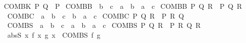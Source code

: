 \begin{isabellebody}
{\isachardoublequoteopen}COMBK\ P\ Q\ {\isacharequal}{\kern0pt}\ P{\isachardoublequoteclose}\isanewline
\isanewline
{}\isamarkupfalse%
\ COMBB\ {\isacharcolon}{\kern0pt}{\isacharcolon}{\kern0pt}\ {\isachardoublequoteopen}{\isacharparenleft}{\kern0pt}{\isacharprime}{\kern0pt}b\ {\isacharequal}{\kern0pt}{\isachargreater}{\kern0pt}\ {\isacharprime}{\kern0pt}c{\isacharparenright}{\kern0pt}\ {\isasymRightarrow}\ {\isacharparenleft}{\kern0pt}{\isacharprime}{\kern0pt}a\ {\isacharequal}{\kern0pt}{\isachargreater}{\kern0pt}\ {\isacharprime}{\kern0pt}b{\isacharparenright}{\kern0pt}\ {\isasymRightarrow}\ {\isacharprime}{\kern0pt}a\ {\isasymRightarrow}\ {\isacharprime}{\kern0pt}c{\isachardoublequoteclose}\ \isanewline
{\isachardoublequoteopen}COMBB\ P\ Q\ R\ {\isacharequal}{\kern0pt}\ P\ {\isacharparenleft}{\kern0pt}Q\ R{\isacharparenright}{\kern0pt}{\isachardoublequoteclose}\isanewline
\isanewline
{}\isamarkupfalse%
\ COMBC\ {\isacharcolon}{\kern0pt}{\isacharcolon}{\kern0pt}\ {\isachardoublequoteopen}{\isacharparenleft}{\kern0pt}{\isacharprime}{\kern0pt}a\ {\isasymRightarrow}\ {\isacharprime}{\kern0pt}b\ {\isasymRightarrow}\ {\isacharprime}{\kern0pt}c{\isacharparenright}{\kern0pt}\ {\isasymRightarrow}\ {\isacharprime}{\kern0pt}b\ {\isasymRightarrow}\ {\isacharprime}{\kern0pt}a\ {\isasymRightarrow}\ {\isacharprime}{\kern0pt}c{\isachardoublequoteclose}\ \isanewline
{\isachardoublequoteopen}COMBC\ P\ Q\ R\ {\isacharequal}{\kern0pt}\ P\ R\ Q{\isachardoublequoteclose}\isanewline
\isanewline
{}\isamarkupfalse%
\ COMBS\ {\isacharcolon}{\kern0pt}{\isacharcolon}{\kern0pt}\ {\isachardoublequoteopen}{\isacharparenleft}{\kern0pt}{\isacharprime}{\kern0pt}a\ {\isasymRightarrow}\ {\isacharprime}{\kern0pt}b\ {\isasymRightarrow}\ {\isacharprime}{\kern0pt}c{\isacharparenright}{\kern0pt}\ {\isasymRightarrow}\ {\isacharparenleft}{\kern0pt}{\isacharprime}{\kern0pt}a\ {\isasymRightarrow}\ {\isacharprime}{\kern0pt}b{\isacharparenright}{\kern0pt}\ {\isasymRightarrow}\ {\isacharprime}{\kern0pt}a\ {\isasymRightarrow}\ {\isacharprime}{\kern0pt}c{\isachardoublequoteclose}\ \isanewline
{\isachardoublequoteopen}COMBS\ P\ Q\ R\ {\isacharequal}{\kern0pt}\ P\ R\ {\isacharparenleft}{\kern0pt}Q\ R{\isacharparenright}{\kern0pt}{\isachardoublequoteclose}\isanewline
\isanewline
{}\isamarkupfalse%
\ abs{\isacharunderscore}{\kern0pt}S{\isacharcolon}{\kern0pt}\ {\isachardoublequoteopen}{\isasymlambda}x{\isachardot}{\kern0pt}\ {\isacharparenleft}{\kern0pt}f\ x{\isacharparenright}{\kern0pt}\ {\isacharparenleft}{\kern0pt}g\ x{\isacharparenright}{\kern0pt}\ {\isasymequiv}\ COMBS\ f\ g{\isachardoublequoteclose}\isanewline

\end{isabellebody}
